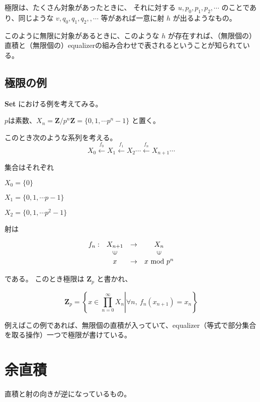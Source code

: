\documentclass[uplatex,a4j,12pt,dvipdfmx]{jsarticle}
\begin{document}
極限は、たくさん対象があったときに、
それに対する $u,p_{0},p_{1},p_{2}, \cdots$ のことであり、同じような $v,q_{0},q_{1},q_{2},, \cdots$ 等があれば一意に射 $h$ が出るようなもの。

このように無限に対象があるときに、このような $h$ が存在すれば、（無限個の）直積と（無限個の）equalizerの組み合わせで表されるということが知られている。

\subsection{極限の例}

\textbf{Set} における例を考えてみる。

$p$は素数、$X_{n} = \mathbf{Z} / p^{n} \mathbf{Z} = \{ 0, 1, \cdots  p^{n} -1 \}$ と置く。

このとき次のような系列を考える。
$$
	X_{0} \xleftarrow{f_{0}} X_{1} \xleftarrow{f_{1}} X_{2} \cdots \xleftarrow{f_{n}} X_{n+1} \cdots
$$

集合はそれぞれ

$X_{0} = \{ 0 \}$

$X_{1} = \{ 0, 1, \cdots p-1 \}$

$X_{2} = \{ 0, 1, \cdots p^{2}-1 \}$

射は

\[
	\begin{array}{cccc}
		f_{n} : & X_{n+1}                 & \to & X_{n}                   \\
		        & \rotatebox{90}{${\in}$} &     & \rotatebox{90}{${\in}$} \\
		        & x                       & \to & x \ \text{mod} \ p^{n}
	\end{array}
\]

である。
このとき極限は $\mathbf{Z}_{p}$ と書かれ、

$$
	\mathbf{Z}_{p}
	= \left. \left\{ x \in \prod^{\infty}_{n=0} X_{n} \right| \forall n , \ f_{n}(x_{n+1}) = x_{n} \right\}
$$

例えばこの例であれば、無限個の直積が入っていて、equalizer（等式で部分集合を取る操作）一つで極限が書けている。



\section{余直積}

直積と射の向きが逆になっているもの。
\end{document}
